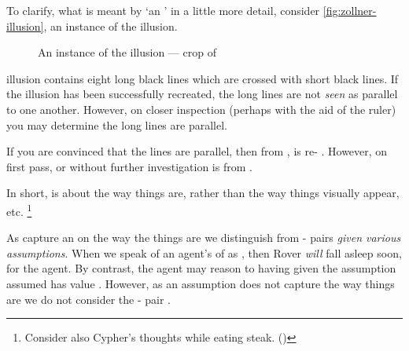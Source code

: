   \begin{note}
    \nocite{Scriven:1962vq}
    \nocite{Woodward:2021ue}
    \nocite{Perry:1979vc}
    \nocite{Perry:1986aa}
    \nocite{Collins:1997wn}
    To clarify, what is meant by `an \agpe{}' in a little more detail, consider \autoref{fig:zollner-illusion}, an instance of the \citeauthor{Zollner:1860vx} illusion.

    \begin{figure}[!h]
      \centering
      \def\svgwidth{\columnwidth}
      
      \caption{An instance of the \citeauthor{Zollner:1860vx} illusion --- crop of ~\textcite{Fibonacci:2007vj}}
      \label{fig:zollner-illusion}
    \end{figure}

    \noindent%
    \citeauthor{Zollner:1860vx} illusion contains eight long black lines which are crossed with short black lines.
    If the illusion has been successfully recreated, the long lines are not \emph{seen} as parallel to one another.
    However, on closer inspection (perhaps with the aid of the ruler) you may determine the long lines are parallel.

    If you are convinced that the lines are parallel, then from ,  is re-\evaled{} .
    However, on first pass, or without further investigation  is \evaled{}  from .

    In short,  is about the way things are, rather than the way things visually appear, etc.%
    \footnote{
      Consider also Cypher's thoughts while eating steak. (\cite[330--331]{Wachowski:2000uh})
    }
  \end{note}

  \begin{note}
    As  capture an \agpe{} on the way the things are we distinguish  from - pairs \emph{given various assumptions}.
    When we speak of an agent's \evalN{} of  as , then Rover \emph{will} fall asleep soon, for the agent.
    By contrast, the agent may reason to  having   given the assumption assumed  has value .
    However, as an assumption does not capture the way things are we do not consider the - pair .
  \end{note}

